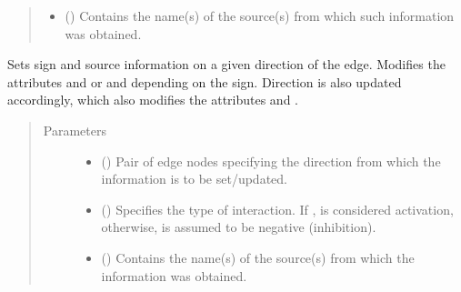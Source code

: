 \documentclass[letterpaper,10pt,english]{sphinxmanual}
\begin{document}
\begin{fulllineitems}
\begin{fulllineitems}
\begin{quote}
\begin{description}
\begin{itemize}
\item {} 
 () \textendash{} Contains the name(s) of the source(s) from which such
information was obtained.

\end{itemize}

\end{description}\end{quote}

\end{fulllineitems}


\begin{fulllineitems}
\label{\detokenize{reference:pypath.main.Direction.set_sign}}
Sets sign and source information on a given direction of the
edge. Modifies the attributes  and
 or  and
 depending on the sign. Direction is
also updated accordingly, which also modifies the attributes
 and .
\begin{quote}\begin{description}
\item[{Parameters}] \leavevmode\begin{itemize}
\item {} 
 () \textendash{} Pair of edge nodes specifying the direction from which the
information is to be set/updated.

\item {} 
 () \textendash{} Specifies the type of interaction. If , is
considered activation, otherwise, is assumed to be negative
(inhibition).

\item {} 
 () \textendash{} Contains the name(s) of the source(s) from which the
information was obtained.


\end{itemize}
\end{description}
\end{quote}
\end{fulllineitems}
\end{fulllineitems}
\end{document}
